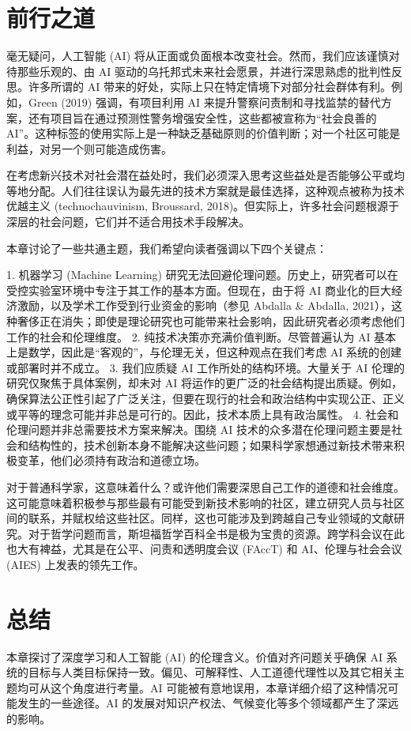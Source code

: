 \section{前行之道}
毫无疑问，人工智能 (AI) 将从正面或负面根本改变社会。然而，我们应该谨慎对待那些乐观的、由 AI 驱动的乌托邦式未来社会愿景，并进行深思熟虑的批判性反思。许多所谓的 AI 带来的好处，实际上只在特定情境下对部分社会群体有利。例如，Green (2019) 强调，有项目利用 AI 来提升警察问责制和寻找监禁的替代方案，还有项目旨在通过预测性警务增强安全性，这些都被宣称为“社会良善的 AI”。这种标签的使用实际上是一种缺乏基础原则的价值判断；对一个社区可能是利益，对另一个则可能造成伤害。

在考虑新兴技术对社会潜在益处时，我们必须深入思考这些益处是否能够公平或均等地分配。人们往往误认为最先进的技术方案就是最佳选择，这种观点被称为技术优越主义 (technochauvinism, Broussard, 2018)。但实际上，许多社会问题根源于深层的社会问题，它们并不适合用技术手段解决。

本章讨论了一些共通主题，我们希望向读者强调以下四个关键点：

1. 机器学习 (Machine Learning) 研究无法回避伦理问题。历史上，研究者可以在受控实验室环境中专注于其工作的基本方面。但现在，由于将 AI 商业化的巨大经济激励，以及学术工作受到行业资金的影响（参见 Abdalla \& Abdalla, 2021），这种奢侈正在消失；即使是理论研究也可能带来社会影响，因此研究者必须考虑他们工作的社会和伦理维度。
2. 纯技术决策亦充满价值判断。尽管普遍认为 AI 基本上是数学，因此是“客观的”，与伦理无关，但这种观点在我们考虑 AI 系统的创建或部署时并不成立。
3. 我们应质疑 AI 工作所处的结构环境。大量关于 AI 伦理的研究仅聚焦于具体案例，却未对 AI 将运作的更广泛的社会结构提出质疑。例如，确保算法公正性引起了广泛关注，但要在现行的社会和政治结构中实现公正、正义或平等的理念可能并非总是可行的。因此，技术本质上具有政治属性。
4. 社会和伦理问题并非总需要技术方案来解决。围绕 AI 技术的众多潜在伦理问题主要是社会和结构性的，技术创新本身不能解决这些问题；如果科学家想通过新技术带来积极变革，他们必须持有政治和道德立场。

对于普通科学家，这意味着什么？或许他们需要深思自己工作的道德和社会维度。这可能意味着积极参与那些最有可能受到新技术影响的社区，建立研究人员与社区间的联系，并赋权给这些社区。同样，这也可能涉及到跨越自己专业领域的文献研究。对于哲学问题而言，斯坦福哲学百科全书是极为宝贵的资源。跨学科会议在此也大有裨益，尤其是在公平、问责和透明度会议 (FAccT) 和 AI、伦理与社会会议 (AIES) 上发表的领先工作。

\section{总结}
本章探讨了深度学习和人工智能 (AI) 的伦理含义。价值对齐问题关乎确保 AI 系统的目标与人类目标保持一致。偏见、可解释性、人工道德代理性以及其它相关主题均可从这个角度进行考量。AI 可能被有意地误用，本章详细介绍了这种情况可能发生的一些途径。AI 的发展对知识产权法、气候变化等多个领域都产生了深远的影响。

